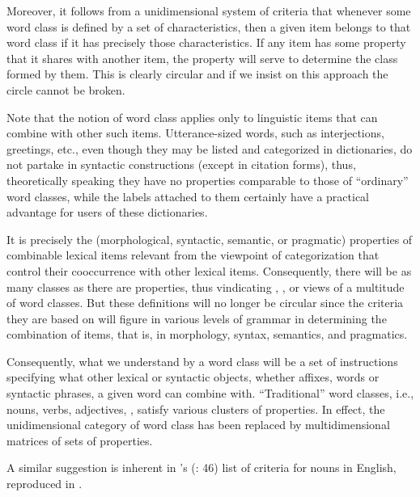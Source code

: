 \documentclass[output=paper]{langsci/langscibook}
\begin{document}
Moreover, it follows from a unidimensional system of criteria that whenever
some word class is defined by a set of characteristics, then a given item
belongs to that word class if it has precisely those characteristics. If any
item has some property that it shares with another item, the property will
serve to determine the class formed by them. This is clearly circular and if we
insist on this approach the circle cannot be broken.

Note that the notion of word class applies only to linguistic items that can
combine with other such items. Utterance-sized words, such as interjections,
greetings, etc., even though they may be listed and categorized in dictionaries, do not partake in syntactic constructions (except
in citation forms), thus, theoretically speaking they have no properties
comparable to those of \enquote{ordinary} word classes, while the labels
attached to them certainly have a practical advantage for users of these
dictionaries.

It is precisely the (morphological, syntactic, semantic, or pragmatic)
properties of combinable lexical items relevant from the viewpoint of
categorization that control their cooccurrence with other lexical items.
Consequently, there will be as many classes as there are properties, thus
vindicating , , or
 views of a multitude of word classes. But these
definitions will no longer be circular since the criteria they are based on
will figure in various levels of grammar in determining the combination of
items, that is, in morphology, syntax, semantics, and pragmatics.

Consequently, what we understand by a word class will be a set of instructions
specifying what other lexical or syntactic objects, whether affixes, words or
syntactic phrases, a given word can combine with. \enquote{Traditional} word
classes, i.e., nouns, verbs, adjectives, , satisfy various clusters of
properties.  In effect, the unidimensional category of word class has been
replaced by multidimensional matrices of sets of properties.

\largerpage
A similar suggestion is inherent in \citeauthor{Crystal1967}’s
(\citeyear{Crystal1967}: 46) list of criteria for
nouns in English, reproduced in .
\end{document}
